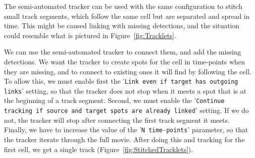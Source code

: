 The semi-automated tracker can be used with the same configuration to stitch small track segments, which follow the same cell but are separated and spread in time. 
This might be caused linking with missing detections, and the situation could resemble what is pictured in Figure~\ref{fig:Tracklets}.

We can use the semi-automated tracker to connect them, and add the missing detections.
We want the tracker to create spots for the cell in time-points when they are missing, and to connect to existing ones it will find by following the cell.
To allow this, we must enable first the '\texttt{Link even if target has outgoing links}' setting, so that the tracker does not stop when it meets a spot that is at the beginning of a track segment.
Second, we must enable the '\texttt{Continue tracking if source and target spots are already linked}' setting.
If we do not, the tracker will stop after connecting the first track segment it meets. 
Finally, we have to increase the value of the '\texttt{N time-points}' parameter, so that the tracker iterate through the full movie. 
After doing this and tracking for the first cell, we get a single track (Figure~\ref{fig:StitchedTracklets}).


